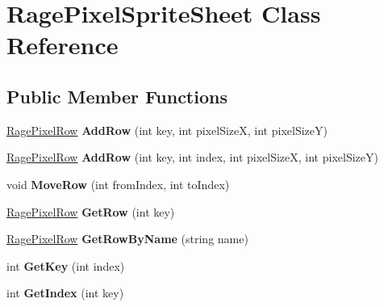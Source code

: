 \hypertarget{class_rage_pixel_sprite_sheet}{\section{Rage\-Pixel\-Sprite\-Sheet Class Reference}
\label{class_rage_pixel_sprite_sheet}
}
\subsection*{Public Member Functions}
\begin{DoxyCompactItemize}
\item 
\hypertarget{class_rage_pixel_sprite_sheet_a3085b28d0e238317cfcf7b9624f4b8ee}{\hyperlink{class_rage_pixel_row}{Rage\-Pixel\-Row} {\bfseries Add\-Row} (int key, int pixel\-Size\-X, int pixel\-Size\-Y)}\label{class_rage_pixel_sprite_sheet_a3085b28d0e238317cfcf7b9624f4b8ee}

\item 
\hypertarget{class_rage_pixel_sprite_sheet_a4f9d8ec6a99d9ae31d5974efd554039d}{\hyperlink{class_rage_pixel_row}{Rage\-Pixel\-Row} {\bfseries Add\-Row} (int key, int index, int pixel\-Size\-X, int pixel\-Size\-Y)}\label{class_rage_pixel_sprite_sheet_a4f9d8ec6a99d9ae31d5974efd554039d}

\item 
\hypertarget{class_rage_pixel_sprite_sheet_aa241db4f20308246c2b70b059304755b}{void {\bfseries Move\-Row} (int from\-Index, int to\-Index)}\label{class_rage_pixel_sprite_sheet_aa241db4f20308246c2b70b059304755b}

\item 
\hypertarget{class_rage_pixel_sprite_sheet_ab54e8274c3cd2a256b7b2befb680c3e4}{\hyperlink{class_rage_pixel_row}{Rage\-Pixel\-Row} {\bfseries Get\-Row} (int key)}\label{class_rage_pixel_sprite_sheet_ab54e8274c3cd2a256b7b2befb680c3e4}

\item 
\hypertarget{class_rage_pixel_sprite_sheet_a500e37a0b7ba3f833f0f0c2c3207b3af}{\hyperlink{class_rage_pixel_row}{Rage\-Pixel\-Row} {\bfseries Get\-Row\-By\-Name} (string name)}\label{class_rage_pixel_sprite_sheet_a500e37a0b7ba3f833f0f0c2c3207b3af}

\item 
\hypertarget{class_rage_pixel_sprite_sheet_a71e69ac7a2154b8a7808c157f1ae1f32}{int {\bfseries Get\-Key} (int index)}\label{class_rage_pixel_sprite_sheet_a71e69ac7a2154b8a7808c157f1ae1f32}

\item 
\hypertarget{class_rage_pixel_sprite_sheet_aaf3851d67ec35485d84cbd940b2c04df}{int {\bfseries Get\-Index} (int key)}\label{class_rage_pixel_sprite_sheet_aaf3851d67ec35485d84cbd940b2c04df}


\end{DoxyCompactItemize}
